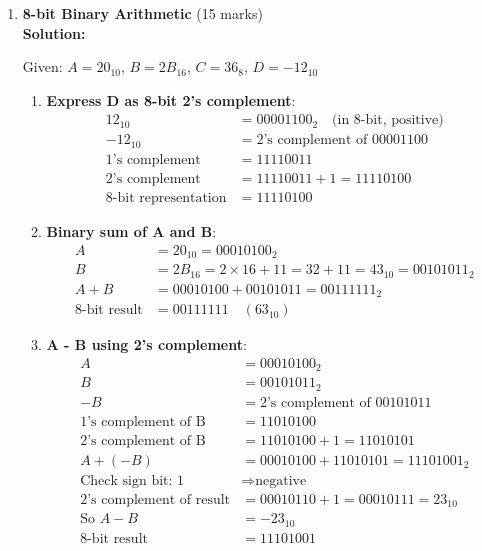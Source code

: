 \documentclass[12pt]{article}
\begin{document}
\begin{enumerate}[left=0pt, label=\bfseries Q\arabic*., start=1]
    \item \textbf{8-bit Binary Arithmetic} \hfill (15 marks)\\
    \textbf{Solution:}
    
    Given: $A = 20_{10}$, $B = 2B_{16}$, $C = 36_{8}$, $D = -12_{10}$
    
    \begin{enumerate}[label=(\alph*)]
        \item \textbf{Express D as 8-bit 2's complement}:
        \begin{align*}
        12_{10} &= 00001100_2 \quad \text{(in 8-bit, positive)} \\
        -12_{10} &= \text{2's complement of } 00001100 \\
        \text{1's complement} &= 11110011 \\
        \text{2's complement} &= 11110011 + 1 = 11110100 \\
        \text{8-bit representation} &= \boxed{11110100}
        \end{align*}
        
        \item \textbf{Binary sum of A and B}:
        \begin{align*}
        A &= 20_{10} = 00010100_2 \\
        B &= 2B_{16} = 2\times16 + 11 = 32 + 11 = 43_{10} = 00101011_2 \\
        A + B &= 00010100 + 00101011 = 00111111_2 \\
        \text{8-bit result} &= \boxed{00111111} \quad (63_{10})
        \end{align*}
        
        \item \textbf{A - B using 2's complement}:
        \begin{align*}
        A &= 00010100_2 \\
        B &= 00101011_2 \\
        -B &= \text{2's complement of } 00101011 \\
        \text{1's complement of B} &= 11010100 \\
        \text{2's complement of B} &= 11010100 + 1 = 11010101 \\
        A + (-B) &= 00010100 + 11010101 = 11101001_2 \\
        \text{Check sign bit: } 1 &\Rightarrow \text{negative} \\
        \text{2's complement of result} &= 00010110 + 1 = 00010111 = 23_{10} \\
        \text{So } A - B &= -23_{10} \\
        \text{8-bit result} &= \boxed{11101001}
        \end{align*}
        

\end{enumerate}
\end{enumerate}
\end{document}
